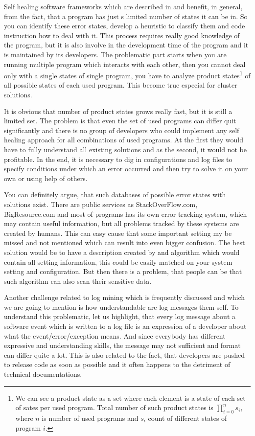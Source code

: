 Self healing software frameworks which are described in \cite{khan2011self} and \cite{garlan2002model} benefit, in general, from the fact, that a program has just s limited number of states it can be in. So you can identify these error states, develop a heuristic to classify them and code instruction how to deal with it. This process requires really good knowledge of the program, but it is also involve in the development time of the program and it is maintained by its developers. The problematic part starts when you are running multiple program which interacts with each other, then you cannot deal only with a single states of single program, you have to analyze product states\footnote{We can see a product state as a set where each element is a state of each set of sates per used program. Total number of such product states is $\prod_{i=0}^{n} s_i$, where $n$ is number of used programs and $s_i$ count of different states of program $i$.} of all possible states of each used program. This become true especial for cluster solutions.

It is obvious that number of product states grows really fast, but it is still a limited set. The problem is that even the set of used programs can differ quit significantly and there is no group of developers who could implement any self healing approach for all combinations of used programs. At the first they would have to fully understand all existing solutions and as the second, it would not be profitable. In the end, it is necessary to dig in configurations and log files to specify conditions under which an error occurred and then try to solve it on your own or using help of others.

You can definitely argue, that such databases of possible error states with solutions exist. There are public services as StackOverFlow.com, BigResource.com and most of programs has its own error tracking system, which may contain useful information, but all problems tracked by these systems are created by humans. This can easy cause that some important setting my be missed and not mentioned which can result into even bigger confusion. The best solution would be to have a description created by and algorithm which would contain all setting information, this could be easily matched on your system setting and configuration. But then there is a problem, that people can be that such algorithm can also scan their sensitive data.

Another challenge related to log mining which is frequently discussed and which we are going to mention is how understandable are log messages them-self. To understand this problematic, let us highlight, that every log message about a software event which is written to a log file is an expression of a developer about what the event/error/exception means. And since everybody has different expressive and understanding skills, the message may not sufficient and format can differ quite a lot. This is also related to the fact, that developers are pushed to release code as soon as possible and it often happens to the detriment of technical documentations.